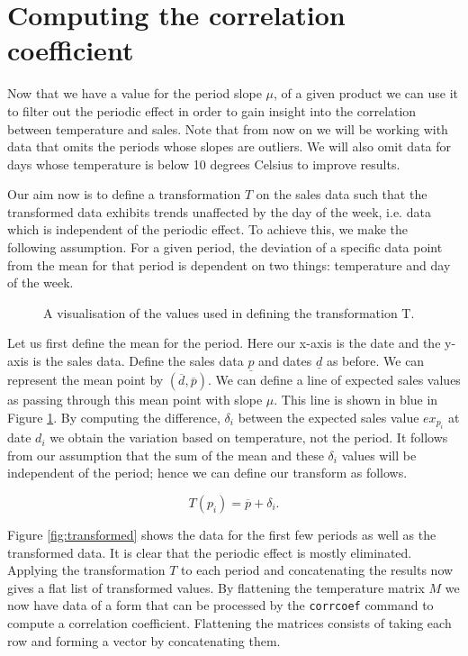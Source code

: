 \section{Computing the correlation coefficient}

Now that we have a value for the period slope $\mu$, of a given product we can use it to filter out the periodic effect in order to gain insight into the correlation between temperature and sales. Note that from now on we will be working with data that omits the periods whose slopes are outliers. We will also omit data for days whose temperature is below 10 degrees Celsius to improve results.

Our aim now is to define a transformation $T$ on the sales data such that the transformed data exhibits trends unaffected by the day of the week, i.e. data which is independent of the periodic effect. To achieve this, we make the following assumption. For a given period, the deviation of a specific data point from the mean for that period is dependent on two things: temperature and day of the week. 

\begin{figure}
\centering

\caption{A visualisation of the values used in defining the transformation T.}
\label{fig:slopestik}
\end{figure}

Let us first define the mean for the period. Here our x-axis is the date and the y-axis is the sales data. Define the sales data $\underline{p}$ and dates $\underline{d}$ as before. We can represent the mean point by $(\overline{d}, \overline{p})$. We can define a line of expected sales values as passing through this mean point with slope $\mu$. This line is shown in blue in Figure \ref{fig:slopestik}. By computing the difference, $\delta_i$ between the expected sales value $ex_{p_i}$ at date $d_i$ we obtain the variation based on temperature, not the period. It follows from our assumption that the sum of the mean and these $\delta_i$ values will be independent of the period; hence we can define our transform as follows.

$$ T(p_i) = \overline{p} + \delta_i .$$

Figure \ref{fig:transformed} shows the data for the first few periods as well as the transformed data. It is clear that the periodic effect is mostly eliminated. Applying the transformation $T$ to each period and concatenating the results now gives a flat list of transformed values. By flattening the temperature matrix $M$ we now have data of a form that can be processed by the \texttt{corrcoef} command to compute a correlation coefficient. Flattening the matrices consists of taking each row and forming a vector by concatenating them.

